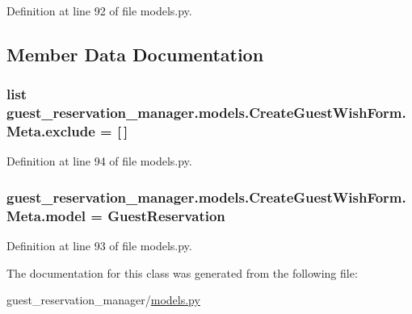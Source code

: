 Definition at line 92 of file models.\-py.



\subsection{Member Data Documentation}
\hypertarget{classguest__reservation__manager_1_1models_1_1CreateGuestWishForm_1_1Meta_a4a8d3d18aa8f12178a23eb0be82cfad8}{
\subsubsection[{exclude}]{\setlength{\rightskip}{0pt plus 5cm}list guest\-\_\-reservation\-\_\-manager.\-models.\-Create\-Guest\-Wish\-Form.\-Meta.\-exclude = \mbox{[}$\,$\mbox{]}\hspace{0.3cm}{\ttfamily [static]}}}\label{classguest__reservation__manager_1_1models_1_1CreateGuestWishForm_1_1Meta_a4a8d3d18aa8f12178a23eb0be82cfad8}


Definition at line 94 of file models.\-py.

\hypertarget{classguest__reservation__manager_1_1models_1_1CreateGuestWishForm_1_1Meta_acf928f83413ee48d0995bab8bf120818}{
\subsubsection[{model}]{\setlength{\rightskip}{0pt plus 5cm}guest\-\_\-reservation\-\_\-manager.\-models.\-Create\-Guest\-Wish\-Form.\-Meta.\-model = {\bf Guest\-Reservation}\hspace{0.3cm}{\ttfamily [static]}}}\label{classguest__reservation__manager_1_1models_1_1CreateGuestWishForm_1_1Meta_acf928f83413ee48d0995bab8bf120818}


Definition at line 93 of file models.\-py.



The documentation for this class was generated from the following file\-:\begin{DoxyCompactItemize}
\item 
guest\-\_\-reservation\-\_\-manager/\hyperlink{guest__reservation__manager_2models_8py}{models.\-py}\end{DoxyCompactItemize}
